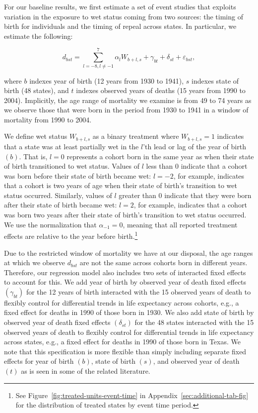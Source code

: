\documentclass[12pt]{article}
\begin{document}
For our baseline results, we first estimate a set of event studies that exploits variation in the exposure to wet status coming from two sources: the timing of birth for individuals and the timing of repeal across states. 
In particular, we estimate the following:

\begin{equation}
    d_{bst} = \sum_{l=-8,l \neq -1}^{7}\alpha_l W_{b+l,s} + \gamma_{bt} + \delta_{st} + \varepsilon_{bst},
\end{equation}

\noindent where $b$ indexes year of birth (12 years from 1930 to 1941), $s$ indexes state of birth (48 states), and $t$ indexes observed years of deaths (15 years from 1990 to 2004). 
Implicitly, the age range of mortality we examine is from 49 to 74 years as we observe those that were born in the period from 1930 to 1941 in a window of mortality from 1990 to 2004. 

We define wet status $W_{b+l,s}$ as a binary treatment where $W_{b+l,s} = 1$ indicates that a state was at least partially wet in the $l$'th lead or lag of the year of birth $(b)$. 
That is, $l = 0$ represents a cohort born in the same year as when their state of birth transitioned to wet status. 
Values of $l$ less than $0$ indicate that a cohort was born before their state of birth became wet: $l = -2$, for example, indicates that a cohort is two years of age when their state of birth's transition to wet status occurred. 
Similarly, values of $l$ greater than 0 indicate that they were born after their state of birth became wet: $l = 2$, for example, indicates that a cohort was born two years after their state of birth's transition to wet status occurred. 
We use the normalization that $\alpha_{-1} = 0$, meaning that all reported treatment effects are relative to the year before birth.\footnote{See Figure~\ref{fig:treated-units-event-time} in Appendix~\ref{sec:additional-tab-fig} for the distribution of treated states by event time period.} 

Due to the restricted window of mortality we have at our disposal, the age ranges at which we observe $d_{bst}$ are not the same across cohorts born in different years. 
Therefore, our regression model also includes two sets of interacted fixed effects to account for this. 
We add year of birth by observed year of death fixed effects $(\gamma_{bt})$ for the 12 years of birth interacted with the 15 observed years of death to flexibly control for differential trends in life expectancy across cohorts, e.g., a fixed effect for deaths in 1990 of those born in 1930. 
We also add state of birth by observed year of death fixed effects $(\delta_{st})$ for the 48 states interacted with the 15 observed years of death to flexibly control for differential trends in life expectancy across states, e.g., a fixed effect for deaths in 1990 of those born in Texas. 
We note that this specification is more flexible than simply including separate fixed effects for year of birth $(b)$, state of birth $(s)$, and observed year of death $(t)$ as is seen in some of the related literature. 
\end{document}
